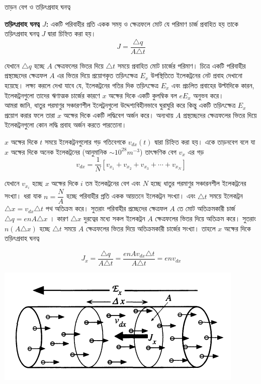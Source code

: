 \documentclass{article}
\begin{document}
\begin{LARGE}
\begin{center}
তাড়ন বেগ ও তড়িৎপ্রবাহ ঘনত্ব
\end{center}
\end{LARGE}
\textbf{তড়িৎপ্রবাহ ঘনত্ব $ J $:} একটি পরিবাহীর প্রতি একক সময় ও ক্ষেত্রফলে মোট যে পরিমাণ চার্জ প্রবাহিত হয় তাকে তড়িৎপ্রবাহ ঘনত্ব $ J $ দ্বারা চিহ্নিত করা হয়।\\
\[ J = \dfrac{\triangle q}{A\triangle t}\]

যেখানে $ \triangle q $ হচ্ছে $ A $ ক্ষেত্রফলের ভিতর দিয়ে $ \triangle t $ সময়ে প্রবাহিত মোট চার্জের পরিমাণ। চিত্রে একটি পরিবাহীর প্রস্থচ্ছেদের ক্ষেত্রফল $ A $ এর ভিতর দিয়ে প্রয়োগকৃত তড়িৎক্ষেত্র $ E_{x} $  উপস্থিতিতে ইলেকট্রনের নেট প্রবাহ দেখানো হয়েছে। লক্ষ্য করলে দেখা যাবে যে, ইলেকট্রনের গতির দিক তড়িৎক্ষেত্র $ E_{x} $ এবং প্রচলিত প্রবাহের উল্টাদিকে কারন, ইলেকট্রনগুলো তাদের ঋণাত্মক চার্জের কারণে $ x $ অক্ষের দিকে একটি কুলম্বিক বল $ eE_{x} $ অনুভব করে।\\

 আমরা জানি, ধাতুর পরমাণুর সঞ্চারণশীল ইলেট্রনগুলো উদ্দেশ্যবিহীনভাবে ঘুরাঘুরি করে কিন্তু একটি তড়িৎক্ষেত্র $ E_{x} $ প্রয়োগ করার ফলে তারা $ x $ অক্ষের দিকে একটি লদ্ধিবেগ অর্জন করে। অন্যথায় $ A $ প্রস্থচ্ছেদের ক্ষেত্রফলের ভিতর দিয়ে ইলেকট্রনগুলো কোন লদ্ধি প্রবাহ অর্জন করতে পারতোনা।
 
 $ x $ অক্ষের দিকে $ t $ সময়ে ইলেকট্রনগুলোর গড় গতিবেগকে $ v_{dx}(t) $ দ্বারা চিহ্নিত করা হয়। একে তাড়নবেগ বলে যা $ x $ অক্ষের দিকে অনেক ইলেকট্রনের (আনুমানিক $ \sim 10^{28} m^{-3} $)  তাৎক্ষণিক বেগ $ v_x $ এর গড়
 \[ v_{dx} = \dfrac{1}{N} [v_{x_{1}} + v_{x_{2}}+ v_{x_{3}}+ \cdots + v_{x_{N}}] \]
 
 
 যেখানে $ v_{x_{i}} $ হচ্ছে $ x $ অক্ষের দিকে $ i $ তম ইলেকট্রনের বেগ এবং $ N $ হচ্ছে ধাতুর পরমাণুর সঞ্চারনশীল ইলেকট্রনের সংখ্যা। ধরা যাক $ n =\dfrac{N}{A}$ হচ্ছে  পরিবাহীর প্রতি একক আয়তনে ইলেকট্রন সংখ্যা। এবং $ \triangle t $ সময়ে ইলেকট্রন $ \triangle x = v_{dx}\triangle t $ পথ অতিক্রম করে। সুতরাং পরিবাহীর প্রচ্ছেদের ক্ষেত্রফল $ A $ তে মোট অতিক্রমকারী চার্জ $ \triangle q = enA\triangle x $ । কারণ $ \triangle x $ দুরত্বের মধ্যে সকল ইলেকট্রন $ A $ ক্ষেত্রফলের ভিতর দিয়ে অতিক্রম করে। সুতরাং $ n(A \triangle x) $ হচ্ছে $ \triangle t $ সময়ে $ A $ ক্ষেত্রফলের ভিতর দিয়ে অতিক্রমকারী চার্জের সংখ্যা। তাহলে $ x $ অক্ষের দিকে তড়িৎপ্রবাহ ঘনত্ব 
 
 \[ J_{x} = \dfrac{\triangle q}{A\triangle t} = \dfrac{enAv_{dx}\triangle t}{A\triangle t} = env_{dx}\]
\begin{center}
\includegraphics{2018-07-24_072834.png}
\end{center}
\end{document}
